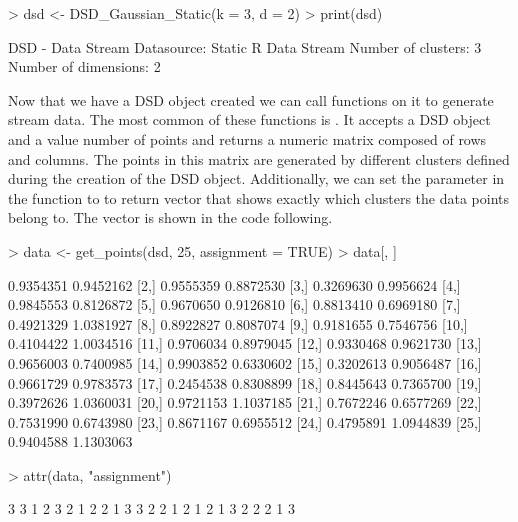 \documentclass[nojss]{jss}
\begin{document}
\begin{Schunk}
\begin{Sinput}
> dsd <- DSD_Gaussian_Static(k = 3, d = 2)
> print(dsd)
\end{Sinput}
\begin{Soutput}
DSD - Data Stream Datasource: Static R Data Stream 
Number of clusters: 3 
Number of dimensions: 2 
\end{Soutput}
\end{Schunk}

Now that we have a DSD object created we can call functions on it to generate stream data. The most common of these functions is . It accepts a DSD object and a value  number of points and returns a numeric matrix composed of  rows and  columns. The points in this matrix are generated by different clusters defined during the creation of the DSD object. Additionally, we can set the parameter  in the  function to  to return vector that shows exactly which clusters the data points belong to. The  vector is shown in the code following.

\begin{Schunk}
\begin{Sinput}
> data <- get_points(dsd, 25, assignment = TRUE)
> data[, ]
\end{Sinput}
\begin{Soutput}
           [,1]      [,2]
 [1,] 0.9354351 0.9452162
 [2,] 0.9555359 0.8872530
 [3,] 0.3269630 0.9956624
 [4,] 0.9845553 0.8126872
 [5,] 0.9670650 0.9126810
 [6,] 0.8813410 0.6969180
 [7,] 0.4921329 1.0381927
 [8,] 0.8922827 0.8087074
 [9,] 0.9181655 0.7546756
[10,] 0.4104422 1.0034516
[11,] 0.9706034 0.8979045
[12,] 0.9330468 0.9621730
[13,] 0.9656003 0.7400985
[14,] 0.9903852 0.6330602
[15,] 0.3202613 0.9056487
[16,] 0.9661729 0.9783573
[17,] 0.2454538 0.8308899
[18,] 0.8445643 0.7365700
[19,] 0.3972626 1.0360031
[20,] 0.9721153 1.1037185
[21,] 0.7672246 0.6577269
[22,] 0.7531990 0.6743980
[23,] 0.8671167 0.6955512
[24,] 0.4795891 1.0944839
[25,] 0.9404588 1.1303063
\end{Soutput}
\begin{Sinput}
> attr(data, "assignment")
\end{Sinput}
\begin{Soutput}
 [1] 3 3 1 2 3 2 1 2 2 1 3 3 2 2 1 2 1 2 1 3 2 2 2 1 3
\end{Soutput}
\end{Schunk}
\end{document}
